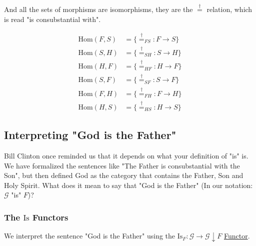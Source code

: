 \documentclass[11pt]{article}
\begin{document}
\begin{center}
\end{center}

And all the sets of morphisms are isomorphisms, they are the $\stackrel{\dagger}{=}$ relation, which is read "is consubstantial with".

\begin{align}
\text{Hom}(F,S) &= \{ \stackrel{\dagger}{=}_{FS} : F \to S \} \\
\text{Hom}(S,H) &= \{ \stackrel{\dagger}{=}_{SH} : S \to H \} \\
\text{Hom}(H,F) &= \{ \stackrel{\dagger}{=}_{HF} : H \to F \} \\
\text{Hom}(S,F) &= \{ \stackrel{\dagger}{=}_{SF} : S \to F \} \\
\text{Hom}(F,H) &= \{ \stackrel{\dagger}{=}_{FH} : F \to H \} \\
\text{Hom}(H,S) &= \{ \stackrel{\dagger}{=}_{HS} : H \to S \}
\end{align}

\subsection{Interpreting "God is the Father"}
\label{sec:god-is-father}

Bill Clinton once reminded us that it depends on what your definition of "is" is. We have formalized the sentences like "The Father is consubstantial with the Son", but then defined God as the category that contains the Father, Son and Holy Spirit. What does it mean to say that "God is the Father" (In our notation: $\mathcal{G}$ "is" $F$)?

\subsubsection{The $\text{Is}$ Functors}
\label{sec:is-functors}

We interpret the sentence "God is the Father" using the $\text{Is}_F : \mathcal{G} \to \mathcal{G}\downarrow F$ \hyperref[sec:functors]{Functor}.
\end{document}
